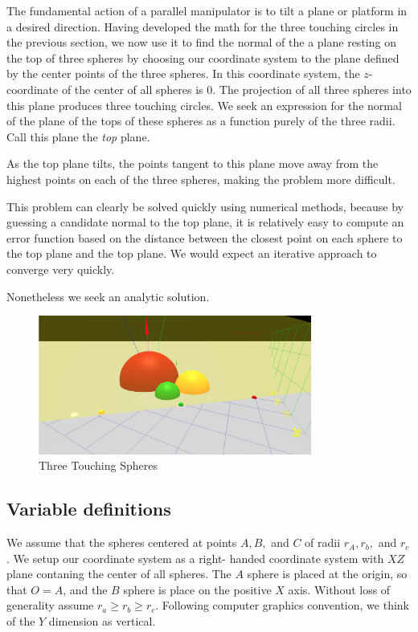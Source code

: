 \documentclass{article}
\begin{document}
The fundamental action of a parallel manipulator is to tilt a plane or platform in a desired direction.
Having developed the math for the three touching circles in the previous section, we now use it
to find the normal of the a plane resting on the top of three spheres by choosing our
coordinate system to the plane defined by the center points of the three spheres.
In this coordinate system, the $z$-coordinate of the center of all spheres is $0$.
The projection of all three spheres into this plane produces three touching circles.
We seek an expression for the normal of the plane of the tops of these spheres as a function
purely of the three radii. Call this plane the {\em top} plane.

As the top plane tilts, the points tangent to this plane move away from the highest points on each of
the three spheres, making the problem more difficult.

This problem can clearly be solved quickly using numerical methods, because by guessing
a candidate normal to the top plane, it is relatively easy to compute an error function based
on the distance between the closest point on each sphere to the top plane and the top plane.
We would expect an iterative approach to converge very quickly.

Nonetheless we seek an analytic solution.

\begin{figure}
     \centering
     \includegraphics[width=0.80\textwidth]{figures/StandardThreeSphereDiagram.png}
     \caption{Three Touching Spheres}
  \label{fig:fixed}
\end{figure}

\subsection{Variable definitions}

We assume that the spheres centered at points $A,B,$ and $C$
of radii $r_A,r_b,$ and $r_c$. We setup our coordinate system as a right-
handed coordinate system with $XZ$ plane contaning the center of all spheres.
The $A$ sphere is placed at the origin, so that $O = A$, and the $B$ sphere
is place on the positive $X$ axis. Without loss of generality assume $r_a \geq r_b \geq r_c$.
Following computer graphics convention, we think of the $Y$ dimension as vertical.
\end{document}
